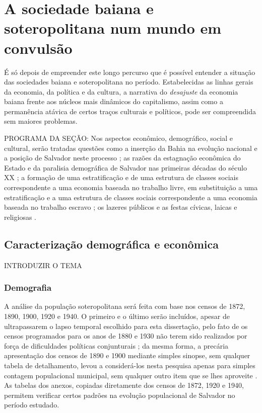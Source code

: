 \section{A sociedade baiana e soteropolitana num mundo em convulsão}\label{sec:sobasotconv}

É só depois de empreender este longo percurso que é possível entender a situação das sociedades baiana e soteropolitana no período. Estabelecidas as linhas gerais da economia, da política e da cultura, a narrativa do \textit{desajuste} da economia baiana frente aos núcleos mais dinâmicos do capitalismo, assim como a permanência atávica de certos traços culturais e políticos, pode ser compreendida sem maiores problemas.

PROGRAMA DA SEÇÃO: Nos aspectos econômico, demográfico, social e cultural, serão tratadas questões como a inserção da Bahia na evolução nacional e a posição de Salvador neste processo \cite{CPE1980}; as razões da estagnação econômica do Estado e da paralisia demográfica de Salvador nas primeiras décadas do século XX \cite{AGUIAR1958, CUNHA2011, santos_repovo_2001, VASCONCELOS2002}; a formação de uma estratificação e de uma estrutura de classes sociais correspondente a uma economia baseada no trabalho livre, em substituição a uma estratificação e a uma estrutura de classes sociais correspondente a uma economia baseada no trabalho escravo \cite{aguiar_hierarquias_1974, batalha_classe_1998, fraga_encruzilhadas_2014, MATTOS2008, santos_repovo_2001, souza_trabalholivre_2011, velho_classes_1977}; os lazeres públicos e as festas cívicas, laicas e religiosas \cite{VASCONCELOS2002}.

\subsection{Caracterização demográfica e econômica}\label{subsec:demoecobasa}

INTRODUZIR O TEMA

\subsubsection{Demografia}\label{subsubsec:demogbasa}

A análise da população soteropolitana será feita com base nos censos de 1872, 1890, 1900, 1920 e 1940. O primeiro e o último serão incluídos, apesar de ultrapassarem o lapso temporal escolhido para esta dissertação, pelo fato de os censos programados para os anos de 1880 e 1930 não terem sido realizados por força de dificuldades políticas conjunturais \cite{oliveirasimoes_censos_2005}; da mesma forma, a precária apresentação dos censos de 1890 e 1900 mediante simples sinopse, sem qualquer tabela de detalhamento, levou a considerá-los nesta pesquisa apenas para simples contagem populacional municipal, sem qualquer outro item que se lhes aproveite \cite{reisetal_areascensos_2011}. As tabelas dos anexos, copiadas diretamente dos censos de 1872, 1920 e 1940, permitem verificar certos padrões na evolução populacional de Salvador no período estudado.

